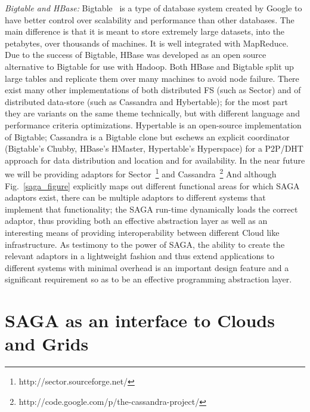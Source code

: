 \documentclass[conference,final]{IEEEtran}
\newcommand{\jhanote}[1]{ {\textcolor{red} { ***SJ: #1 }}}
\newcommand{\jhanote}[1]{}
\begin{document}
{\it Bigtable and HBase:} Bigtable~\cite{bigtable_small} is a type of
database system created by Google to have better control over
scalability and performance than other databases.  The main difference
is that it is meant to store extremely large datasets, into the
petabytes, over thousands of machines.  It is well integrated with
MapReduce.  Due to the success of Bigtable, HBase was developed as an
open source alternative to Bigtable for use with Hadoop.  Both HBase
and Bigtable split up large tables and replicate them over many
machines to avoid node failure.  There exist many other
implementations of both distributed FS (such as Sector) and of
distributed data-store (such as Cassandra and Hybertable); for the
most part they are variants on the same theme technically, but with
different language and performance criteria optimizations.  Hypertable
is an open-source implementation of Bigtable; Cassandra is a Bigtable
clone but eschews an explicit coordinator (Bigtable's Chubby, HBase's
HMaster, Hypertable's Hyperspace) for a P2P/DHT approach for data
distribution and location and for availability.  In the near future we
will be providing adaptors for
Sector~\footnote{http://sector.sourceforge.net/} and
Cassandra~\footnote{http://code.google.com/p/the-cassandra-project/}
And although Fig.~\ref{saga_figure} explicitly maps out different
functional areas for which SAGA adaptors exist, there can be multiple
adaptors to different systems that implement that functionality; the
SAGA run-time dynamically loads the correct adaptor, thus providing
both an effective abstraction layer as well as an interesting means of
providing interoperability between different Cloud like
infrastructure.  As testimony to the power of SAGA, the ability to
create the relevant adaptors in a lightweight fashion and thus extend
applications to different systems with minimal overhead is an
important design feature and a significant requirement so as to be an
effective programming abstraction layer.


\section{SAGA as an interface to Clouds and Grids}

\end{document}

